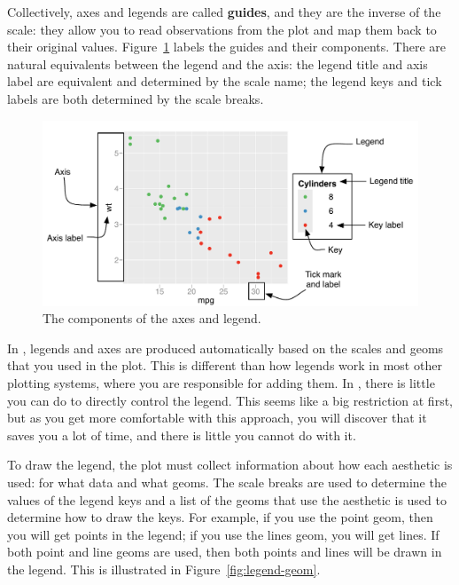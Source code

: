 Collectively, axes and legends are called {\bf guides}, and they are the inverse of the scale: they allow you to read observations from the plot and map them back to their original values.  Figure~\ref{fig:labelled-guides} labels the guides and their components.  There are natural equivalents between the legend and the axis: the legend title and axis label are equivalent and determined by the scale name; the legend keys and tick labels are both determined by the scale breaks.

\begin{figure}[htbp]
  \centering
  \includegraphics[width=\linewidth]{scale-guides}
  
  \caption{The components of the axes and legend.}
  \label{fig:labelled-guides}
\end{figure}

In \ggplot, legends and axes are produced automatically based on the scales and geoms that you used in the plot. This is different than how legends work in most other plotting systems, where you are responsible for adding them.  In \ggplot, there is little you can do to directly control the legend.  This seems like a big restriction at first, but as you get more comfortable with this approach, you will discover that it saves you a lot of time, and there is little you cannot do with it.

To draw the legend, the plot must collect information about how each aesthetic is used: for what data and what geoms. The scale breaks are used to determine the values of the legend keys and a list of the geoms that use the aesthetic  is used to determine how to draw the keys. For example, if you use the point geom, then you will get points in the legend; if you use the lines geom, you will get lines. If both point and line geoms are used, then both points and lines will be drawn in the legend.  This is illustrated in Figure~\ref{fig:legend-geom}.

